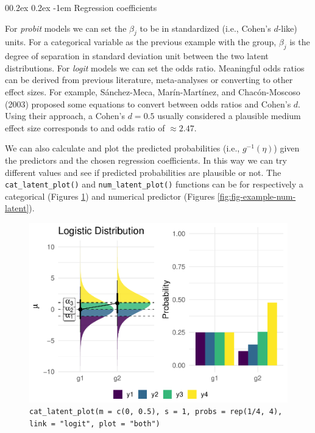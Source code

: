 \documentclass[
  man,floatsintext]{apa6}
\makeatletter
\let\oldparagraph\paragraph
\renewcommand{\paragraph}[1]{\oldparagraph{#1}\mbox{}}
\renewcommand{\paragraph}{\@startsection{paragraph}{4}{\parindent}%
  {0\baselineskip \@plus 0.2ex \@minus 0.2ex}%
  {-1em}%
  {\normalfont\normalsize\bfseries\itshape\typesectitle}}
\makeatother
\begin{document}
\paragraph{Regression coefficients}\label{regression-coefficients}

For \emph{probit} models we can set the \(\beta_j\) to be in standardized (i.e., Cohen's \(d\)-like) units. For a categorical variable as the previous example with the group, \(\beta_j\) is the degree of separation in standard deviation unit between the two latent distributions. For \emph{logit} models we can set the odds ratio. Meaningful odds ratios can be derived from previous literature, meta-analyses or converting to other effect sizes. For example, Sánchez-Meca, Marín-Martínez, and Chacón-Moscoso (2003) proposed some equations to convert between odds ratios and Cohen's \(d\). Using their approach, a Cohen's \(d = 0.5\) usually considered a plausible medium effect size corresponds to and odds ratio of \(\approx 2.47\).

We can also calculate and plot the predicted probabilities (i.e., \(g^{-1}(\eta)\)) given the predictors and the chosen regression coefficients. In this way we can try different values and see if predicted probabilities are plausible or not. The \texttt{cat\_latent\_plot()} and \texttt{num\_latent\_plot()} functions can be for respectively a categorical (Figures \ref{fig:fig-example-cat-latent}) and numerical predictor (Figures \ref{fig:fig-example-num-latent}).

\scriptsize

\begin{figure}

{\centering \includegraphics{paper-new_files/figure-latex/fig-example-cat-latent-1} 

}

\caption{\texttt{cat\_latent\_plot(m\ =\ c(0,\ 0.5),\ s\ =\ 1,\ probs\ =\ rep(1/4,\ 4),\ link\ =\ "logit",\ plot\ =\ "both")}}\label{fig:fig-example-cat-latent}
\end{figure}
\end{document}
